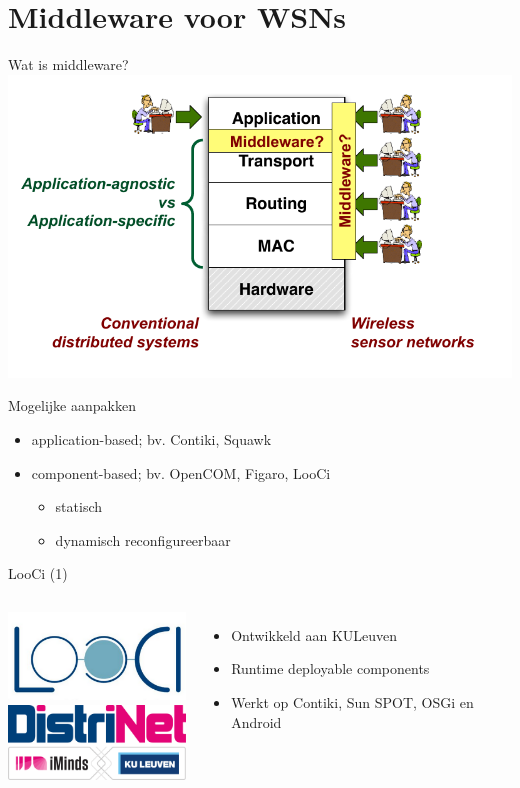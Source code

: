 \documentclass[presentation, bigger]{beamer}
\begin{document}
\section{Middleware voor WSNs}
\label{sec-2}
\begin{frame}[label=sec-2-1]{Wat is middleware?}
\includegraphics[width=\textwidth,keepaspectration=true]{middleware}
\end{frame}

\begin{frame}[label=sec-2-2]{Mogelijke aanpakken}
\begin{itemize}
\item application-based; bv. Contiki, Squawk
\item component-based; bv. OpenCOM, Figaro, LooCi
\begin{itemize}
\item statisch
\item dynamisch reconfigureerbaar
\end{itemize}
\end{itemize}
\end{frame}

\begin{frame}[label=sec-2-3]{LooCi (1)}
\begin{columns}[t]
\centering
\includegraphics[width=5cm,keepaspectration=true]{looci/looci.png}\\
\includegraphics[width=5cm,keepaspectration=true]{looci/distrinet.png}
\centering
\begin{itemize}
\item Ontwikkeld aan KULeuven
\item Runtime deployable components
\item Werkt op Contiki, Sun SPOT, OSGi en Android
\end{itemize}
\end{columns}
\end{frame}
\end{document}
